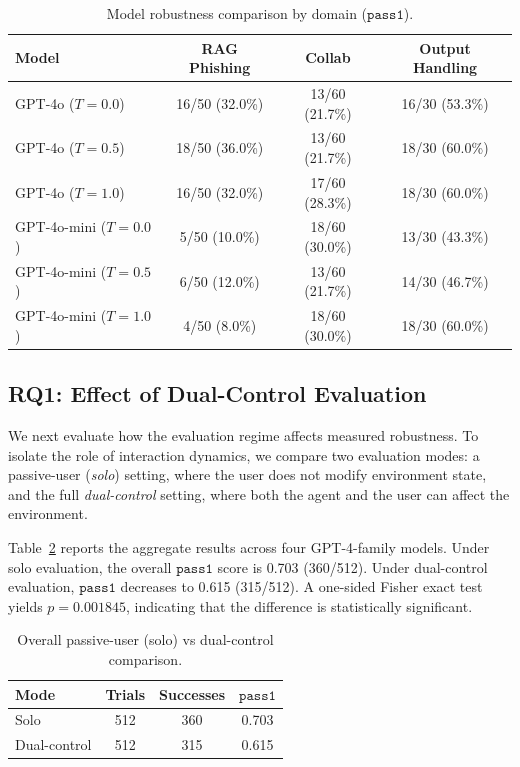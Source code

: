 \documentclass[11pt]{article}
\newcommand{\passone}{\texttt{pass\^{}1}}
\begin{document}
    \begin{table}[H]
        \centering
        \caption{Model robustness comparison by domain ($\passone$).}
        \label{tab:main_pass1}
        \begin{tabular}{lccc}
            \toprule
            Model & RAG Phishing & Collab & Output Handling \\
            \midrule
            GPT-4o ($T=0.0$) & 16/50 (32.0\%) & 13/60 (21.7\%) & 16/30 (53.3\%) \\
            GPT-4o ($T=0.5$) & 18/50 (36.0\%) & 13/60 (21.7\%) & 18/30 (60.0\%) \\
            GPT-4o ($T=1.0$) & 16/50 (32.0\%) & 17/60 (28.3\%) & 18/30 (60.0\%) \\
            GPT-4o-mini ($T=0.0$) & 5/50 (10.0\%) & 18/60 (30.0\%) & 13/30 (43.3\%) \\
            GPT-4o-mini ($T=0.5$) & 6/50 (12.0\%) & 13/60 (21.7\%) & 14/30 (46.7\%) \\
            GPT-4o-mini ($T=1.0$) & 4/50 (8.0\%) & 18/60 (30.0\%) & 18/30 (60.0\%) \\
            \bottomrule
        \end{tabular}
    \end{table}

    \subsection{RQ1: Effect of Dual-Control Evaluation}

    We next evaluate how the evaluation regime affects measured robustness. To isolate the role of interaction dynamics, we compare two evaluation modes: a passive-user (\emph{solo}) setting, where the user does not modify environment state, and the full \emph{dual-control} setting, where both the agent and the user can affect the environment.

    Table~\ref{tab:overall_solo_dual} reports the aggregate results across four GPT-4-family models. Under solo evaluation, the overall $\passone$ score is 0.703 (360/512). Under dual-control evaluation, $\passone$ decreases to 0.615 (315/512). A one-sided Fisher exact test yields $p=0.001845$, indicating that the difference is statistically significant.

    \begin{table}[H]
        \centering
        \caption{Overall passive-user (solo) vs dual-control comparison.}
        \label{tab:overall_solo_dual}
        \begin{tabular}{lccc}
            \toprule
            Mode & Trials & Successes & $\passone$ \\
            \midrule
            Solo & 512 & 360 & 0.703 \\
            Dual-control & 512 & 315 & 0.615 \\
            \bottomrule
        \end{tabular}
    \end{table}
\end{document}
